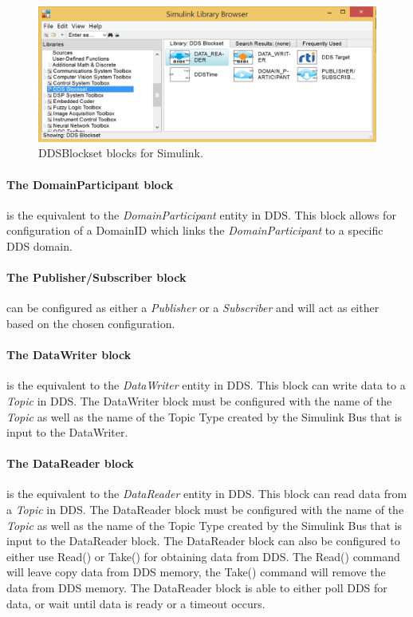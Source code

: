\begin{figure}[h]
\includegraphics[width=\textwidth]{figures/DDSBlockset}
	\caption[DDSBlockset blocks for Simulink]{
		\label{fig:DDSBlocksetBlocks} 
		\footnotesize{%
			DDSBlockset blocks for Simulink.
		}
	}
\end{figure}


\paragraph{The DomainParticipant block} is the equivalent to the \textit{DomainParticipant} entity in DDS. This block allows for configuration of a DomainID which links the \textit{DomainParticipant} to a specific DDS domain.

\paragraph{The Publisher/Subscriber block} can be configured as either a \textit{Publisher} or a \textit{Subscriber} and will act as either based on the chosen configuration.

\paragraph{The DataWriter block} is the equivalent to the \textit{DataWriter} entity in DDS. This block can write data to a \textit{Topic} in DDS. The DataWriter block must be configured with the name of the \textit{Topic} as well as the name of the Topic Type created by the Simulink Bus that is input to the DataWriter.

\paragraph{The DataReader block} is the equivalent to the \textit{DataReader} entity in DDS. This block can read data from a \textit{Topic} in DDS. The DataReader block must be configured with the name of the \textit{Topic} as well as the name of the Topic Type created by the Simulink Bus that is input to the DataReader block. The DataReader block can also be configured to either use Read() or Take() for obtaining data from DDS. The Read() command will leave copy data from DDS memory, the Take() command will remove the data from DDS memory. The DataReader block is able to either poll DDS for data, or wait until data is ready or a timeout occurs.

